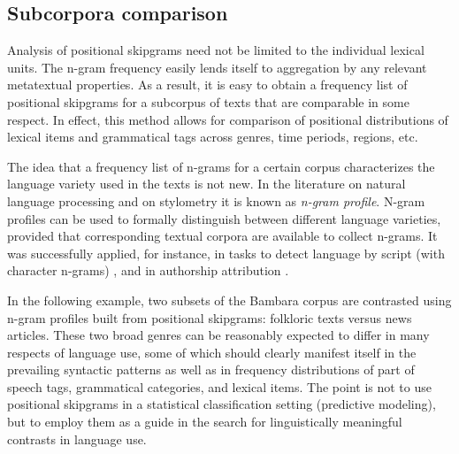 \documentclass[12pt]{article}
\begin{document}
\subsection{Subcorpora comparison}


Analysis of positional skipgrams need not be limited to the individual
lexical units. The n-gram frequency easily lends itself to aggregation
by any relevant metatextual properties. As a result, it is easy to
obtain a frequency list of positional skipgrams for a subcorpus of
texts that are comparable in some respect. In effect, this method
allows for comparison of positional distributions of lexical items and
grammatical tags across genres, time periods, regions, etc.

The idea that a frequency list of n-grams for a certain corpus
characterizes the language variety used in the texts is not new. In
the literature on natural language processing and on stylometry it is
known as \textit{n-gram profile}. N-gram profiles can be used to
formally distinguish between different language varieties, provided
that corresponding textual corpora are available to collect n-grams.
It was successfully applied, for instance, in tasks to detect
language by script (with character n-grams) \autocite{cavnar1994n}, and
in authorship attribution \autocite{koppel2003exploiting}.

In the following example, two subsets of the Bambara corpus are
contrasted using n-gram profiles built from positional skipgrams:
folkloric texts versus news articles. These two broad genres can be
reasonably expected to differ in many respects of language use, some
of which should clearly manifest itself in the prevailing syntactic
patterns as well as in frequency distributions of part of speech tags,
grammatical categories, and lexical items. The point is not to use
positional skipgrams in a statistical classification setting
(predictive modeling), but to employ them as a guide in the search for
linguistically meaningful contrasts in language use.
\end{document}
